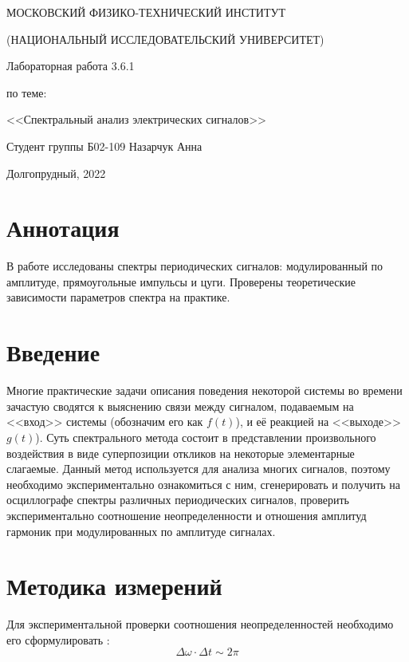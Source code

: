 \documentclass[a4paper,12pt]{article} %
\begin{document}
\begin{titlepage}

\thispagestyle{empty}

\centerline{МОСКОВСКИЙ ФИЗИКО-ТЕХНИЧЕСКИЙ ИНСТИТУТ}
\centerline{(НАЦИОНАЛЬНЫЙ ИССЛЕДОВАТЕЛЬСКИЙ УНИВЕРСИТЕТ)}

\vfill

\centerline{\huge{Лабораторная работа 3.6.1}}
\centerline{\large{по теме:}}
\centerline{\LARGE{<<Спектральный анализ электрических сигналов>>}}

\vfill

Студент группы Б02-109 \hfill Назарчук Анна

\vfill

\centerline{Долгопрудный, 2022}
\clearpage
\end{titlepage} 
\section{Аннотация}
В работе исследованы спектры периодических сигналов: модулированный по амплитуде, прямоугольные импульсы и цуги. Проверены теоретические зависимости параметров спектра на практике.


\section{Введение}
Многие практические задачи описания поведения некоторой системы во времени зачастую сводятся к выяснению связи между сигналом, подаваемым на <<вход>>
системы (обозначим его как $f(t)$), и её реакцией на <<выходе>> $g(t)$). Суть спектрального метода состоит в представлении произвольного воздействия в виде суперпозиции откликов на некоторые элементарные слагаемые. Данный метод используется для анализа многих сигналов, поэтому необходимо экспериментально ознакомиться с ним, сгенерировать и получить на осциллографе спектры различных периодических сигналов, проверить экспериментально соотношение неопределенности и отношения амплитуд гармоник при модулированных по амплитуде сигналах.

\section{Методика измерений}
Для экспериментальной проверки соотношения неопределенностей необходимо его сформулировать \cite{labnik}:
\begin{equation}
\Delta \omega \cdot \Delta t \sim 2\pi
\end{equation}
\end{document}
